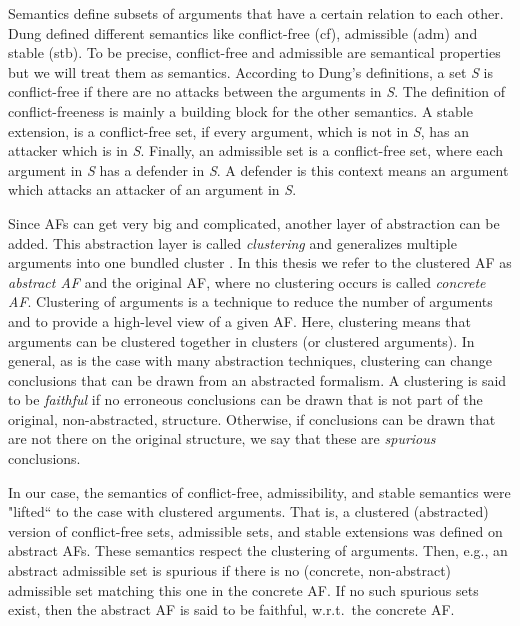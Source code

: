 Semantics define subsets of arguments that have a certain relation to each other. Dung defined different semantics \cite{Dung1995-DUNOTA-2} like conflict-free (cf), admissible (adm) and stable (stb). To be precise, conflict-free and admissible are semantical properties but we will treat them as semantics. According to Dung's definitions, a set \textit{S} is conflict-free if there are no attacks between the arguments in \textit{S}. The definition of conflict-freeness is mainly a building block for the other semantics.
A stable extension, is a conflict-free set, if every argument, which is not in \textit{S}, has an attacker which is in \textit{S}.
Finally, an admissible set is a conflict-free set, where each argument in \textit{S} has a defender in \textit{S}. A defender is this context means an argument which attacks an attacker of an argument in \textit{S}.


Since AFs can get very big and complicated, another layer of abstraction can be added. This abstraction layer is called \emph{clustering} and generalizes multiple arguments into one bundled cluster \cite{DBLP:conf/kr/SaribaturW21}. In this thesis we refer to the clustered AF as \emph{abstract AF} and the original AF, where no clustering occurs is called \emph{concrete AF}.
Clustering of arguments is a technique to reduce the number of arguments and to provide a high-level view of a given AF. Here, clustering means that arguments can be clustered together in clusters (or clustered arguments). In general, as is the case with many abstraction techniques, clustering can change conclusions that can be drawn from an abstracted formalism. A clustering is said to be \emph{faithful} if no erroneous conclusions can be drawn that is not part of the original, non-abstracted, structure. Otherwise, if conclusions can be drawn that are not there on the original structure, we say that these are \emph{spurious} conclusions.

In our case, the semantics of conflict-free, admissibility, and stable semantics were "lifted`` to the case with clustered arguments. That is, a clustered (abstracted) version of conflict-free sets, admissible sets, and stable extensions was defined on abstract AFs. These semantics respect the clustering of arguments. Then, e.g., an abstract admissible set is spurious if there is no (concrete, non-abstract) admissible set matching this one in the concrete AF. If no such spurious sets exist, then the abstract AF is said to be faithful, w.r.t.\ the concrete AF.






